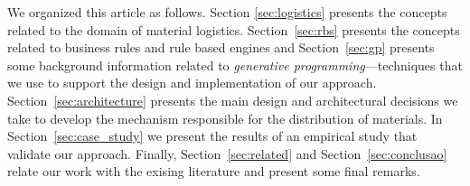 We organized this article as follows. Section \ref{sec:logistics} presents the concepts 
related to the domain of material logistics. Section~\ref{sec:rbs} presents the concepts 
related to business rules and rule based engines and Section~\ref{sec:gp} presents some 
background information related to \emph{generative programming}---techniques that we use to support the 
design and implementation of our approach. Section~\ref{sec:architecture}
presents the main design and architectural decisions we take 
to develop the mechanism responsible for the distribution of materials. In Section~\ref{sec:case_study} we present the 
results of an empirical study that validate our approach. Finally, Section~\ref{sec:related} and
Section~\ref{sec:conclusao} relate our work with the exising literature and present some final 
remarks. 

